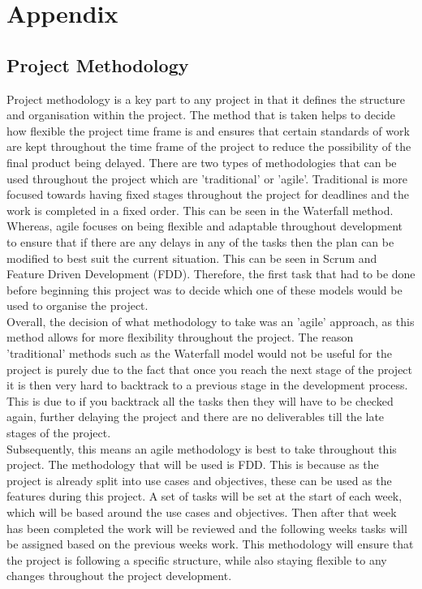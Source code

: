 \documentclass{report}
\begin{document}
\chapter{Appendix}
\section{Project Methodology}
Project methodology is a key part to any project in that it defines the structure and organisation within the project. The method that is taken helps to decide how flexible the project time frame is and ensures that certain standards of work are kept throughout the time frame of the project to reduce the possibility of the final product being delayed. There are two types of methodologies that can be used throughout the project which are 'traditional' or 'agile'. Traditional is more focused towards having fixed stages throughout the project for deadlines and the work is completed in a fixed order. This can be seen in the Waterfall method\cite{WaterfallModel}. Whereas, agile focuses on being flexible and adaptable throughout development to ensure that if there are any delays in any of the tasks then the plan can be modified to best suit the current situation. This can be seen in Scrum\cite{Scrum}  and Feature Driven Development (FDD)\cite{FDD}. Therefore, the first task that had to be done before beginning this project was to decide which one of these models would be used to organise the project. \\ \newline
Overall, the decision of what methodology to take was an 'agile' approach, as this method allows for more flexibility throughout the project. The reason 'traditional' methods such as  the Waterfall model would not be useful for the project is purely due to the fact that once you reach the next stage of the project it is then very hard to backtrack to a previous stage in the development process. This is due to if you backtrack all the tasks then they will have to be checked again, further delaying the project and there are no deliverables till the late stages of the project. \\ \newline
Subsequently, this means an agile methodology is best to take throughout this project. The methodology that will be used is FDD. This is because as the project is already split into use cases and objectives, these can be used as the features during this project. A set of tasks will be set at the start of each week, which will be based around the use cases and objectives. Then after that week has been completed the work will be reviewed and the following weeks tasks will be assigned based on the previous weeks work. This methodology will ensure that the project is following a specific structure, while also staying flexible to any changes throughout the project development.\\ \newline
\end{document}
